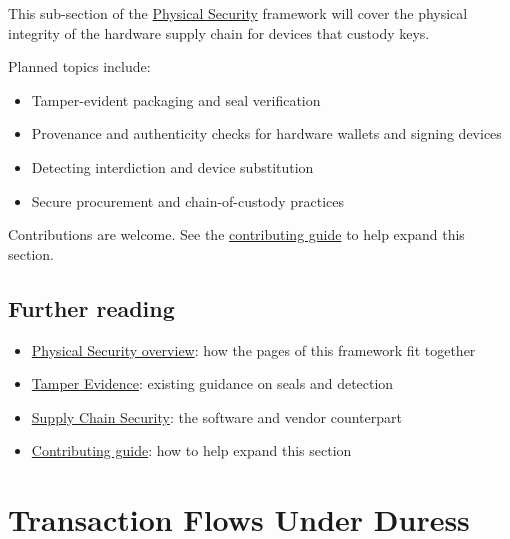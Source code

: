 This sub-section of the \href{https://frameworks.securityalliance.dev/physical-security/overview}{Physical Security} framework will cover the physical integrity of the hardware supply chain for devices that custody keys.

Planned topics include:

\begin{itemize}
\tightlist
\item
  Tamper-evident packaging and seal verification
\item
  Provenance and authenticity checks for hardware wallets and signing devices
\item
  Detecting interdiction and device substitution
\item
  Secure procurement and chain-of-custody practices
\end{itemize}

Contributions are welcome. See the \href{https://frameworks.securityalliance.dev/contribute/contributing}{contributing guide} to help expand this section.

\section{Further reading}\label{further-reading-7}

\begin{itemize}
\tightlist
\item
  \href{https://frameworks.securityalliance.dev/physical-security/overview}{Physical Security overview}: how the pages of this framework fit together
\item
  \href{https://frameworks.securityalliance.dev/opsec/control-domains/physical-environmental/tamper-evidence}{Tamper Evidence}: existing guidance on seals and detection
\item
  \href{https://frameworks.securityalliance.dev/supply-chain/overview}{Supply Chain Security}: the software and vendor counterpart
\item
  \href{https://frameworks.securityalliance.dev/contribute/contributing}{Contributing guide}: how to help expand this section
\end{itemize}


\chapter{Transaction Flows Under Duress}\label{transaction-flows-under-duress}

